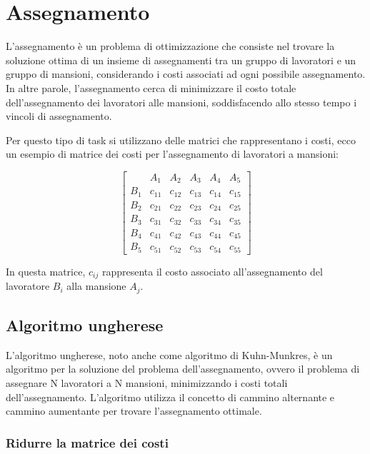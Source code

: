 \chapter{Assegnamento}
L'assegnamento è un problema di ottimizzazione che consiste nel trovare la soluzione ottima di un insieme di assegnamenti tra un gruppo di lavoratori e un gruppo di mansioni, considerando i costi associati ad ogni possibile assegnamento. In altre parole, l'assegnamento cerca di minimizzare il costo totale dell'assegnamento dei lavoratori alle mansioni, soddisfacendo allo stesso tempo i vincoli di assegnamento.

Per questo tipo di task si utilizzano delle matrici che rappresentano i costi,
ecco un esempio di matrice dei costi per l'assegnamento di lavoratori a mansioni:

\begin{equation}
\begin{bmatrix}
 & A_1 & A_2 & A_3 & A_4 & A_5 \\
B_1 & c_{11} & c_{12} & c_{13} & c_{14} & c_{15} \\
B_2 & c_{21} & c_{22} & c_{23} & c_{24} & c_{25} \\
B_3 & c_{31} & c_{32} & c_{33} & c_{34} & c_{35} \\
B_4 & c_{41} & c_{42} & c_{43} & c_{44} & c_{45} \\
B_5 & c_{51} & c_{52} & c_{53} & c_{54} & c_{55}
\end{bmatrix}
\end{equation}

In questa matrice, $c_{ij}$ rappresenta il costo associato all'assegnamento del lavoratore $B_i$ alla mansione $A_j$.

\section{Algoritmo ungherese}
L'algoritmo ungherese, noto anche come algoritmo di Kuhn-Munkres, è un algoritmo per la soluzione del problema dell'assegnamento, ovvero il problema di assegnare N lavoratori a N mansioni, minimizzando i costi totali dell'assegnamento. L'algoritmo utilizza il concetto di cammino alternante e cammino aumentante per trovare l'assegnamento ottimale.
\subsection{Ridurre la matrice dei costi}

